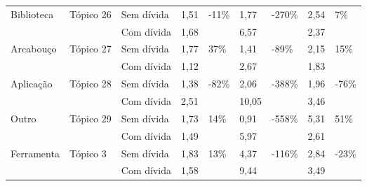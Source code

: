 \begin{longtable}{|l|l|l|l|l|l|l|l|l|}
\multirow{2}{*}{Biblioteca}    & \multirow{2}{*}{Tópico 26} & Sem dívida              & 1,51            & \multirow{2}{*}{-11\%}  & 1,77            & \multirow{2}{*}{-270\%}  & 2,54            & \multirow{2}{*}{7\%}    \\ \cline{3-4} \cline{6-6} \cline{8-8}
                               &                            & Com dívida           & 1,68            &                         & 6,57            &                          & 2,37            &                         \\ \hline
\multirow{2}{*}{Arcabouço}     & \multirow{2}{*}{Tópico 27} & Sem dívida              & 1,77            & \multirow{2}{*}{37\%}   & 1,41            & \multirow{2}{*}{-89\%}   & 2,15            & \multirow{2}{*}{15\%}   \\ \cline{3-4} \cline{6-6} \cline{8-8}
                               &                            & Com dívida           & 1,12            &                         & 2,67            &                          & 1,83            &                         \\ \hline
\multirow{2}{*}{Aplicação}     & \multirow{2}{*}{Tópico 28} & Sem dívida              & 1,38            & \multirow{2}{*}{-82\%}  & 2,06            & \multirow{2}{*}{-388\%}  & 1,96            & \multirow{2}{*}{-76\%}  \\ \cline{3-4} \cline{6-6} \cline{8-8}
                               &                            & Com dívida           & 2,51            &                         & 10,05           &                          & 3,46            &                         \\ \hline
\multirow{2}{*}{Outro}         & \multirow{2}{*}{Tópico 29} & Sem dívida              & 1,73            & \multirow{2}{*}{14\%}   & 0,91            & \multirow{2}{*}{-558\%}  & 5,31            & \multirow{2}{*}{51\%}   \\ \cline{3-4}

 \cline{6-6} \cline{8-8}
                               &                            & Com dívida           & 1,49            &                         & 5,97            &                          & 2,61            &                         \\ \hline 

\multirow{2}{*}{Ferramenta}    & \multirow{2}{*}{Tópico 3}  & Sem dívida              & 1,83            & \multirow{2}{*}{13\%}   & 4,37            & \multirow{2}{*}{-116\%}  & 2,84            & \multirow{2}{*}{-23\%}  \\ \cline{3-4} \cline{6-6} \cline{8-8} 
                               &                            & Com dívida           & 1,58            &                         & 9,44            &                          & 3,49            &                         \\ \hline
                               

\end{longtable}
